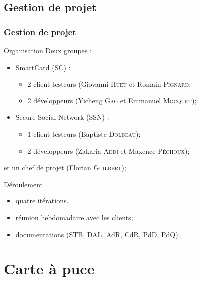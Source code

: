 \documentclass{beamer}
\begin{document}
\subsection{Gestion de projet}
\begin{frame}
    \frametitle{Gestion de projet}
    \begin{block}{Organisation}
        Deux groupes : 
        \begin{itemize}
            \item SmartCard (SC) :  
                \begin{itemize}
                    \item 2 client-testeurs (Giovanni \textsc{Huet} et Romain 
                            \textsc{Pignard};
                    \item 2 développeurs (Yicheng \textsc{Gao} et Emmanuel 
                            \textsc{Mocquet});
                \end{itemize}
            \item Secure Social Network (SSN) : 
                \begin{itemize}
                    \item 1 client-testeurs (Baptiste \textsc{Dolbeau});
                    \item 2 développeurs (Zakaria \textsc{Addi} et Maxence 
                            \textsc{Péchoux});
                \end{itemize}
            
        \end{itemize}
        et un chef de projet (Florian \textsc{Guilbert});
    \end{block}
    \begin{block}{Déroulement}
        \begin{itemize}
            \item quatre itérations.
            \item réunion hebdomadaire avec les clients;
            \item documentations (STB, DAL, AdR, CdR, PdD, PdQ);
        \end{itemize}
    \end{block}
\end{frame}

\section{Carte à puce}
\end{document}
